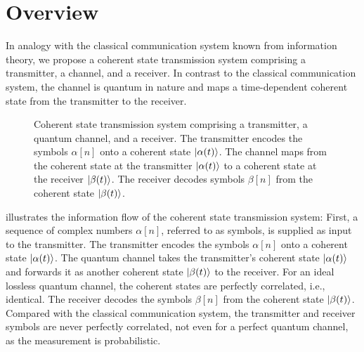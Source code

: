 \section{Overview}

In analogy with the classical communication system known from information theory, we propose a coherent state transmission system comprising a transmitter, a channel, and a receiver.
In contrast to the classical communication system, the channel is quantum in nature and maps a time-dependent coherent state from the transmitter to the receiver.
\begin{figure}[htb]
	\centering
	
	\caption{Coherent state transmission system comprising a transmitter, a quantum channel, and a receiver. The transmitter encodes the symbols $\alpha[n]$ onto a coherent state $\ket{\alpha(t)}$. The channel maps from the coherent state at the transmitter $\ket{\alpha(t)}$ to a coherent state at the receiver $\ket{\beta(t)}$. The receiver decodes symbols $\beta[n]$ from the coherent state $\ket{\beta(t)}$.}\label{fig:transmission_system}
\end{figure}
 illustrates the information flow of the coherent state transmission system:
First, a sequence of complex numbers $\alpha[n]$, referred to as symbols, is supplied as input to the transmitter.
The transmitter encodes the symbols $\alpha[n]$ onto a coherent state $\ket{\alpha(t)}$.
The quantum channel takes the transmitter's coherent state $\ket{\alpha(t)}$ and forwards it as another coherent state $\ket{\beta(t)}$ to the receiver.
For an ideal lossless quantum channel, the coherent states are perfectly correlated, i.e., identical.
The receiver decodes the symbols $\beta[n]$ from the coherent state $\ket{\beta(t)}$.
Compared with the classical communication system, the transmitter and receiver symbols are never perfectly correlated, not even for a perfect quantum channel, as the measurement is probabilistic.
